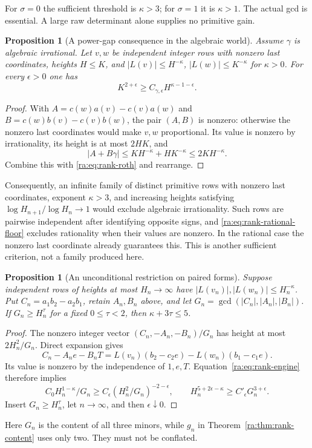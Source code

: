 \documentclass[11pt,a4paper]{article}
\newtheorem{proposition}[theorem]{Proposition}
\theoremstyle{definition}
\theoremstyle{remark}
\theoremstyle{plain}
\numberwithin{equation}{section}
\begin{document}
For $\sigma=0$ the sufficient threshold is $\kappa>3$; for
$\sigma=1$ it is $\kappa>1$.  The actual gcd is essential.  A large
raw determinant alone supplies no primitive gain.

\begin{proposition}[A power-gap consequence in the algebraic world]
\label{ra:prop:rank-gap}
Assume $\gamma$ is algebraic irrational.  Let $v,w$ be independent
integer rows with nonzero last coordinates, heights $H\le K$, and
$|L(v)|\le H^{-\kappa}$, $|L(w)|\le K^{-\kappa}$ for $\kappa>0$.
For every $\epsilon>0$ one has
\[
 K^{2+\epsilon}\ge C_{\gamma,\epsilon}
                      H^{\kappa-1-\epsilon}.
\]
\end{proposition}
\begin{proof}
With $A=c(w)a(v)-c(v)a(w)$ and
$B=c(w)b(v)-c(v)b(w)$, the pair $(A,B)$ is nonzero: otherwise the
nonzero last coordinates would make $v,w$ proportional.  Its value is
nonzero by irrationality, its height is at most $2HK$, and
\[
 |A+B\gamma|\le K H^{-\kappa}+H K^{-\kappa}
                      \le2K H^{-\kappa}.
\]
Combine this with \eqref{ra:eq:rank-roth} and rearrange.
\end{proof}
Consequently, an infinite family of distinct primitive rows with
nonzero last coordinates, exponent $\kappa>3$, and increasing heights
satisfying $\log H_{n+1}/\log H_n\to1$ would exclude algebraic
irrationality.  Such rows are pairwise independent after identifying
opposite signs, and \eqref{ra:eq:rank-rational-floor} excludes rationality
when their values are nonzero.  In the rational case the nonzero last
coordinate already guarantees this.  This is another sufficient
criterion, not a family produced here.

\begin{proposition}[An unconditional restriction on paired forms]
\label{ra:prop:rank-engine-pair}
Suppose independent rows of heights at most $H_n\to\infty$ have
$|L(v_n)|,|L(w_n)|\le H_n^{-\kappa}$.  Put
$C_n=a_1b_2-a_2b_1$, retain $A_n,B_n$ above, and let
$G_n=\gcd(|C_n|,|A_n|,|B_n|)$.
If $G_n\ge H_n^\tau$ for a fixed $0\le\tau<2$, then
$\kappa+3\tau\le5$.
\end{proposition}
\begin{proof}
The nonzero integer vector $(C_n,-A_n,-B_n)/G_n$ has height at most
$2H_n^2/G_n$.  Direct expansion gives
\[
 C_n-A_ne-B_nT
 =L(v_n)(b_2-c_2e)-L(w_n)(b_1-c_1e).
\]
Its value is nonzero by the independence of $1,e,T$.
Equation~\eqref{ra:eq:rank-engine} therefore implies
\[
 C_0 H_n^{1-\kappa}/G_n
 \ge C_\epsilon(H_n^2/G_n)^{-2-\epsilon},
 \qquad
 H_n^{5+2\epsilon-\kappa}\ge C'_{\epsilon}G_n^{3+\epsilon}.
\]
Insert $G_n\ge H_n^\tau$, let $n\to\infty$, and then
$\epsilon\downarrow0$.
\end{proof}
Here $G_n$ is the content of all three minors, while $g_n$ in
Theorem~\ref{ra:thm:rank-content} uses only two.  They must not be conflated.
\end{document}
